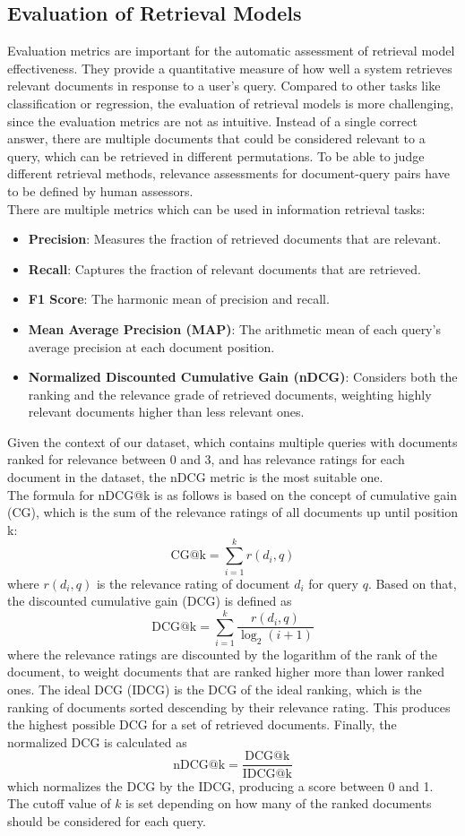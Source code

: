 \subsection{Evaluation of Retrieval Models}\label{sec:evaluation-of-retrieval-models}
Evaluation metrics are important for the automatic assessment of retrieval model effectiveness.
They provide a quantitative measure of how well a system retrieves relevant documents in response to a user's query.
Compared to other tasks like classification or regression, the evaluation of retrieval models is more challenging, since the evaluation metrics are not as intuitive.
Instead of a single correct answer, there are multiple documents that could be considered relevant to a query, which can be retrieved in different permutations.
To be able to judge different retrieval methods, relevance assessments for document-query pairs have to be defined by human assessors.
\\
There are multiple metrics which can be used in information retrieval tasks:
\begin{itemize}
    \item \textbf{Precision}: Measures the fraction of retrieved documents that are relevant.
    \item \textbf{Recall}: Captures the fraction of relevant documents that are retrieved.
    \item \textbf{F1 Score}: The harmonic mean of precision and recall.
    \item \textbf{Mean Average Precision (MAP)}: The arithmetic mean of each query's average precision at each document position.
    \item \textbf{Normalized Discounted Cumulative Gain (nDCG)}: Considers both the ranking and the relevance grade of retrieved documents, weighting highly relevant documents higher than less relevant ones.
\end{itemize}
Given the context of our dataset, which contains multiple queries with documents ranked for relevance between 0 and 3, and has relevance ratings for each document in the dataset, the nDCG metric is the most suitable one.
\\
The formula for nDCG@k is as follows is based on the concept of cumulative gain (CG), which is the sum of the relevance ratings of all documents up until position k:
\[ \text{CG@k} = \sum_{i=1}^{k} r(d_i,q) \]
where $r(d_i,q)$ is the relevance rating of document $d_i$ for query $q$.
Based on that, the discounted cumulative gain (DCG) is defined as
\[ \text{DCG@k} = \sum_{i=1}^{k} \frac{r(d_i,q)}{\log_2(i+1)} \]
where the relevance ratings are discounted by the logarithm of the rank of the document, to weight documents that are ranked higher more than lower ranked ones.
The ideal DCG (IDCG) is the DCG of the ideal ranking, which is the ranking of documents sorted descending by their relevance rating.
This produces the highest possible DCG for a set of retrieved documents.
Finally, the normalized DCG is calculated as
\[ \text{nDCG@k} = \frac{\text{DCG@k}}{\text{IDCG@k}} \]
which normalizes the DCG by the IDCG, producing a score between 0 and 1.
The cutoff value of $k$ is set depending on how many of the ranked documents should be considered for each query.

